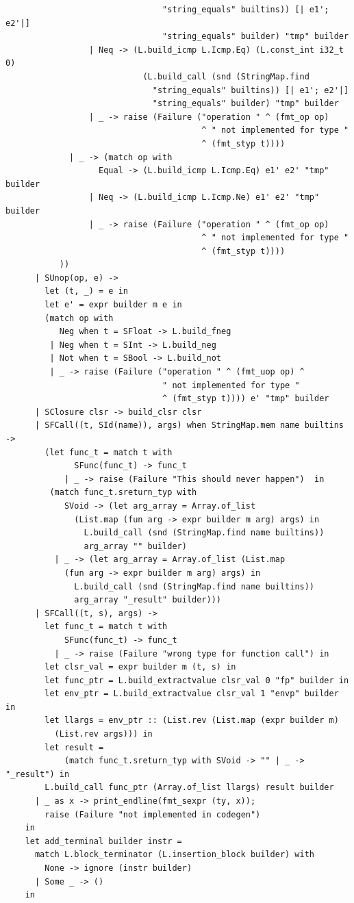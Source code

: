 \documentclass[12pt]{article}
\begin{document}
\begin{mdframed}[hidealllines=true,backgroundcolor=blue!20]
\begin{lstlisting}
                                "string_equals" builtins)) [| e1'; e2'|] 
                                "string_equals" builder) "tmp" builder
                 | Neq -> (L.build_icmp L.Icmp.Eq) (L.const_int i32_t 0)
                            (L.build_call (snd (StringMap.find 
                              "string_equals" builtins)) [| e1'; e2'|] 
                              "string_equals" builder) "tmp" builder
                 | _ -> raise (Failure ("operation " ^ (fmt_op op)
                                        ^ " not implemented for type " 
                                        ^ (fmt_styp t))))
             | _ -> (match op with
                   Equal -> (L.build_icmp L.Icmp.Eq) e1' e2' "tmp" builder
                 | Neq -> (L.build_icmp L.Icmp.Ne) e1' e2' "tmp" builder
                 | _ -> raise (Failure ("operation " ^ (fmt_op op)
                                        ^ " not implemented for type " 
                                        ^ (fmt_styp t))))
           ))
      | SUnop(op, e) ->
        let (t, _) = e in
        let e' = expr builder m e in
        (match op with
           Neg when t = SFloat -> L.build_fneg
         | Neg when t = SInt -> L.build_neg
         | Not when t = SBool -> L.build_not
         | _ -> raise (Failure ("operation " ^ (fmt_uop op) ^ 
                                " not implemented for type " 
                                ^ (fmt_styp t)))) e' "tmp" builder
      | SClosure clsr -> build_clsr clsr
      | SFCall((t, SId(name)), args) when StringMap.mem name builtins ->
        (let func_t = match t with
              SFunc(func_t) -> func_t 
            | _ -> raise (Failure "This should never happen")  in
         (match func_t.sreturn_typ with 
            SVoid -> (let arg_array = Array.of_list 
              (List.map (fun arg -> expr builder m arg) args) in
                L.build_call (snd (StringMap.find name builtins)) 
                arg_array "" builder)
          | _ -> (let arg_array = Array.of_list (List.map 
            (fun arg -> expr builder m arg) args) in
              L.build_call (snd (StringMap.find name builtins)) 
              arg_array "_result" builder)))
      | SFCall((t, s), args) ->
        let func_t = match t with
            SFunc(func_t) -> func_t
          | _ -> raise (Failure "wrong type for function call") in
        let clsr_val = expr builder m (t, s) in
        let func_ptr = L.build_extractvalue clsr_val 0 "fp" builder in
        let env_ptr = L.build_extractvalue clsr_val 1 "envp" builder in
        let llargs = env_ptr :: (List.rev (List.map (expr builder m) 
          (List.rev args))) in
        let result = 
            (match func_t.sreturn_typ with SVoid -> "" | _ -> "_result") in
        L.build_call func_ptr (Array.of_list llargs) result builder
      | _ as x -> print_endline(fmt_sexpr (ty, x)); 
        raise (Failure "not implemented in codegen")
    in
    let add_terminal builder instr =
      match L.block_terminator (L.insertion_block builder) with
        None -> ignore (instr builder)
      | Some _ -> ()
    in


\end{lstlisting}
\end{mdframed}
\end{document}
